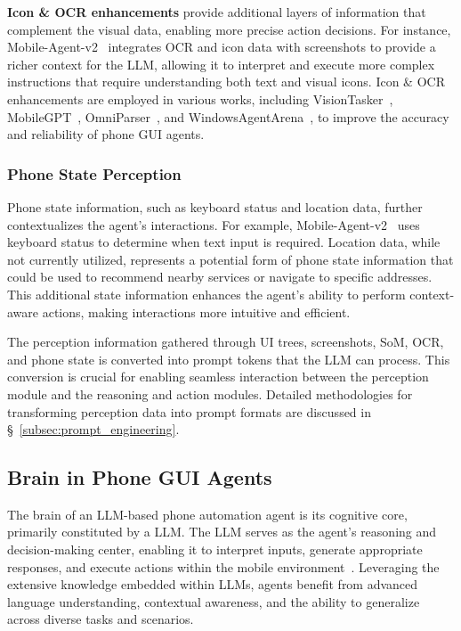 \noindent\textbf{Icon \& OCR enhancements}
provide additional layers of information that complement the visual data, enabling more precise action decisions. For instance, Mobile-Agent-v2~\cite{wang2024mobileagentv2} integrates OCR and icon data with screenshots to provide a richer context for the LLM, allowing it to interpret and execute more complex instructions that require understanding both text and visual icons. Icon \& OCR enhancements are employed in various works, including VisionTasker~\cite{song2024visiontasker}, MobileGPT~\cite{lee2023exploremobilegpt},  OmniParser~\cite{lu2024omniparser}, and WindowsAgentArena~\cite{bonatti2024windows}, to improve the accuracy and reliability of phone GUI agents.


\subsubsection{Phone State Perception}

Phone state information, such as keyboard status and location data, further contextualizes the agent's interactions. For example, Mobile-Agent-v2~\cite{wang2024mobileagentv2} uses keyboard status to determine when text input is required. Location data, while not currently utilized, represents a potential form of phone state information that could be used to recommend nearby services or navigate to specific addresses. This additional state information enhances the agent's ability to perform context-aware actions, making interactions more intuitive and efficient.



The perception information gathered through UI trees, screenshots, SoM, OCR, and phone state is converted into prompt tokens that the LLM can process. This conversion is crucial for enabling seamless interaction between the perception module and the reasoning and action modules. Detailed methodologies for transforming perception data into prompt formats are discussed in \S\ \ref{subsec:prompt_engineering}.

\subsection{Brain in Phone GUI Agents}
\label{subsec:brain}

The brain of an LLM-based phone automation agent is its cognitive core, primarily constituted by a  LLM. The LLM serves as the agent's reasoning and decision-making center, enabling it to interpret inputs, generate appropriate responses, and execute actions within the mobile environment~\cite{ge2023llm,mei2024aios}. Leveraging the extensive knowledge embedded within LLMs, agents benefit from advanced language understanding, contextual awareness, and the ability to generalize across diverse tasks and scenarios.

